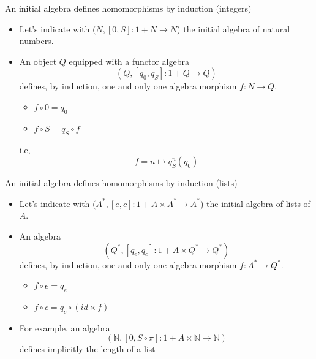 \documentclass[presentation]{beamer}
\begin{document}
\begin{frame}[label={sec:org48b8cdf}]{An initial algebra defines homomorphisms by induction (integers)}
\begin{itemize}
\item Let's indicate with \((N, [0,S]: 1 + N \rightarrow N\)) the \alert{initial} algebra of
natural numbers.

\item An object \(Q\) equipped with a functor algebra $$(Q, [q_0,q_S]:
      1+Q\rightarrow Q)$$ defines, by induction, one and only one algebra
morphism \(f: N \rightarrow Q\).

\begin{itemize}
\item \(f \circ 0 = q_0\)
\item \(f \circ S = q_S \circ f\)
\end{itemize}

i.e, $$f = n \mapsto q_S^n(q_0)$$
\end{itemize}
\end{frame}

\begin{frame}[label={sec:org45f1971}]{An initial algebra defines homomorphisms by induction (lists)}
\begin{itemize}
\item Let's indicate with \((A^*, [e,c]: 1 + A \times A^* \rightarrow A^*\)) the
\alert{initial} algebra of lists of \(A\).

\item An algebra $$(Q^*, [q_e,q_c]:
      1+A \times Q^* \rightarrow Q^*)$$ defines, by induction, one and only one algebra
morphism \(f: A^* \rightarrow Q^*\).

\begin{itemize}
\item \(f \circ e = q_e\)
\item \(f \circ c = q_c \circ (id \times f)\)
\end{itemize}

\item For example, an algebra $$(\mathbb{N}, [0, S \circ \pi]: 1+A \times
      \mathbb{N} \rightarrow \mathbb{N})$$ defines implicitly the length of a list
\end{itemize}
\end{frame}
\end{document}
